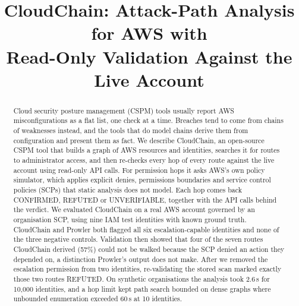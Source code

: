 \documentclass[conference]{IEEEtran}
\begin{document}
\title{CloudChain: Attack-Path Analysis for AWS with\\Read-Only Validation Against the Live Account}

\author{
\and
{}
\and
{}
\and
{}
\and
{}
}

\maketitle

\begin{abstract}
Cloud security posture management (CSPM) tools usually report AWS misconfigurations as a flat list, one check at a time. Breaches tend to come from chains of weaknesses instead, and the tools that do model chains derive them from configuration and present them as fact. We describe CloudChain, an open-source CSPM tool that builds a graph of AWS resources and identities, searches it for routes to administrator access, and then re-checks every hop of every route against the live account using read-only API calls. For permission hops it asks AWS's own policy simulator, which applies explicit denies, permissions boundaries and service control policies (SCPs) that static analysis does not model. Each hop comes back CONFIRMED, REFUTED or UNVERIFIABLE, together with the API calls behind the verdict. We evaluated CloudChain on a real AWS account governed by an organisation SCP, using nine IAM test identities with known ground truth. CloudChain and Prowler both flagged all six escalation-capable identities and none of the three negative controls. Validation then showed that four of the seven routes CloudChain derived (57\%) could not be walked because the SCP denied an action they depended on, a distinction Prowler's output does not make. After we removed the escalation permission from two identities, re-validating the stored scan marked exactly those two routes REFUTED. On synthetic organisations the analysis took 2.6\,s for 10{,}000 identities, and a hop limit kept path search bounded on dense graphs where unbounded enumeration exceeded 60\,s at 10 identities.
\end{abstract}
\end{document}
